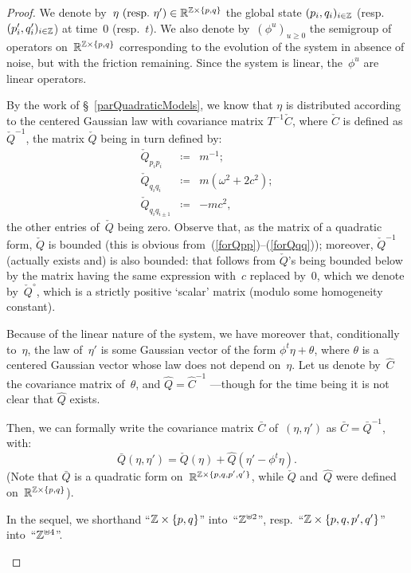 \begin{proof}
We denote by~$\eta \text{\ (resp.\ $\eta'$)} \in \RR^{\ZZ\times\{p,q\}}$
the global state $(p_i,q_i)_{i\in\mathbb{Z}}$ (resp.~$(p'_i,q'_i)_{i\in\mathbb{Z}}$) at time~$0$ (resp.~$t$).
We also denote by~$(\phi^u)_{u\geq0}$ the semigroup of operators on~$\mathbb{R}^{\mathbb{Z}\times\{p,q\}}$
corresponding to the evolution of the system in absence of noise, but with the friction remaining.
Since the system is linear, the~$\phi^u$ are linear operators.

By the work of \S~\ref{parQuadraticModels},
we know that $\eta$ is distributed according to the centered Gaussian law
with covariance matrix $T^{-1}\check{C}$, where $\check{C}$ is defined as $\check{Q}^{-1}$,
the matrix $\check{Q}$ being in turn defined by:
\begin{eqnarray}
\label{forQpp} \check{Q}_{p_ip_i} &\coloneqq& m^{-1} ;\\
\label{forQpq} \check{Q}_{q_iq_i} &\coloneqq& m (\omega^2 + 2c^2) ;\\
\label{forQqq} \check{Q}_{q_iq_{i\pm1}} &\coloneqq& -mc^2 ,
\end{eqnarray}
the other entries of~$\check{Q}$ being zero.
Observe that, as the matrix of a quadratic form,
$\check{Q}$ is bounded (this is obvious from~(\ref{forQpp})--(\ref{forQqq}));
moreover, $\check{Q}^{-1}$ (actually exists and) is also bounded:
that follows from $\check{Q}$'s being bounded below by
the matrix having the same expression with~$c$ replaced by~$0$,
which we denote by~$\check{Q}^\circ$, which is a strictly positive `scalar' matrix
(modulo some homogeneity constant).

Because of the linear nature of the system, we have moreover that,
conditionally to~$\eta$, the law of~$\eta'$ is some Gaussian vector
of the form $\phi^{t}\eta + \theta$, where $\theta$ is a centered Gaussian vector
whose law does not depend on~$\eta$.
Let us denote by~$\hat{C}$ the covariance matrix of~$\theta$,
and $\hat{Q} = \hat{C}^{-1}$ —though for the time being it is not clear that $\hat{Q}$ exists.

Then, we can formally write the covariance matrix $\bar{C}$ of~$(\eta,\eta')$ as
$\bar{C} = \bar{Q}^{-1}$, with:
\[\label{for7743}
\bar{Q}(\eta,\eta') = \check{Q}(\eta) + \hat{Q}(\eta'-\phi^{t}\eta) .\]
(Note that $\bar{Q}$ is a quadratic form on~$\mathbb{R}^{\mathbb{Z}\times\{p,q,p',q'\}}$,
while $\check{Q}$ and~$\hat{Q}$ were defined on~$\mathbb{R}^{\mathbb{Z}\times\{p,q\}}$).

\begin{Not}
In the sequel, we shorthand ``$\mathbb{Z}\times\{p,q\}$'' into~``$\mathbb{Z}^{\uplus2}$'',
resp.\ ``$\mathbb{Z}\times\{p,q,p',q'\}$'' into~``$\mathbb{Z}^{\uplus4}$''.
\end{Not}


\end{proof}

